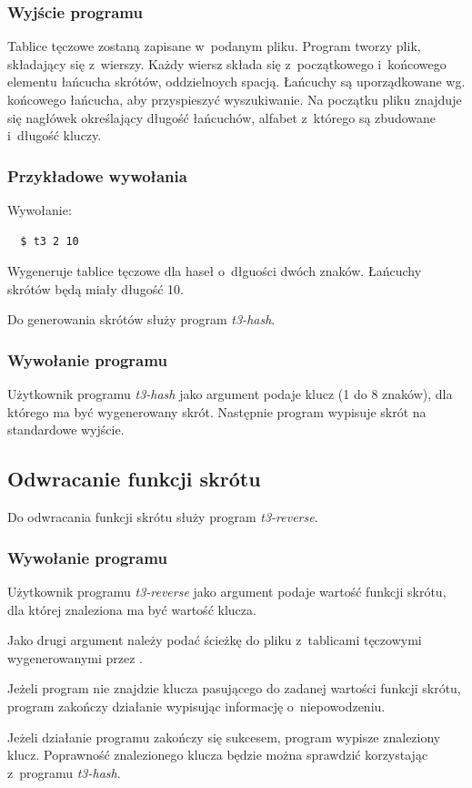 \documentclass[a4paper]{scrartcl}
\begin{document}
\subsubsection{Wyjście programu}
Tablice tęczowe zostaną zapisane w~podanym pliku.
Program tworzy plik, składający się z~wierszy. Każdy wiersz składa się z~początkowego i~końcowego elementu łańcucha skrótów, oddzielnoych spacją.
Łańcuchy są uporządkowane wg. końcowego łańcucha, aby przyspieszyć wyszukiwanie.
Na początku pliku znajduje się nagłówek określający długość łańcuchów, alfabet z~którego są zbudowane i~długość kluczy.

\subsubsection{Przykładowe wywołania}
Wywołanie:
\begin{lstlisting}
  $ t3 2 10
\end{lstlisting}
Wygeneruje tablice tęczowe dla haseł o~dłguości dwóch znaków. Łańcuchy skrótów będą miały długość 10.

Do generowania skrótów służy program \emph{t3-hash}.
\subsubsection{Wywołanie programu}
Użytkownik programu \emph{t3-hash} jako argument podaje klucz (1 do 8 znaków), dla którego ma być wygenerowany skrót.
Następnie program wypisuje skrót na standardowe wyjście.

\subsection{Odwracanie funkcji skrótu}
Do odwracania funkcji skrótu służy program \emph{t3-reverse}.
\subsubsection{Wywołanie programu}
Użytkownik programu \emph{t3-reverse} jako argument podaje wartość funkcji skrótu, dla której znaleziona ma być wartość klucza.

Jako drugi argument należy podać ścieżkę do pliku z~tablicami tęczowymi wygenerowanymi przez \ttt.

Jeżeli program nie znajdzie klucza pasującego do zadanej wartości funkcji skrótu, program zakończy działanie wypisując informację o~niepowodzeniu.

Jeżeli działanie programu zakończy się sukcesem, program wypisze znaleziony klucz. Poprawność znalezionego klucza będzie można sprawdzić korzystając z~programu \emph{t3-hash}.
\end{document}
